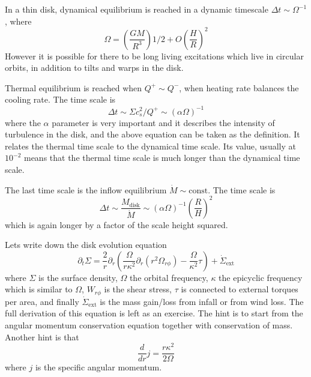 \documentclass[letterpaper, 11pt]{article}
\numberwithin{equation}{section}
\numberwithin{figure}{section}
\begin{document}
In a thin disk, dynamical equilibrium is reached in a dynamic timescale $\Delta
t \sim \Omega^{-1}$, where
\begin{equation}
  \label{eq:5}
  \Omega = \left( \frac{GM}{R^3} \right)1/2 + O \left( \frac{H}{R} \right)^2
\end{equation}
However it is possible for there to be long living excitations which live in
circular orbits, in addition to tilts and warps in the disk.

Thermal equilibrium is reached when $Q^+ \sim Q^{-}$, when heating rate balances
the cooling rate. The time scale is
\begin{equation}
  \label{eq:6}
  \Delta t \sim \Sigma c_s^2 / Q^+ \sim (\alpha\Omega)^{-1}
\end{equation}
where the $\alpha$ parameter is very important and it describes the intensity of
turbulence in the disk, and the above equation can be taken as the definition.
It relates the thermal time scale to the dynamical time scale. Its value,
usually at $10^{-2}$ means that the thermal time scale is much longer than the
dynamical time scale.

The last time scale is the inflow equilibrium $\dot{M} \sim \mathrm{const}$. The
time scale is
\begin{equation}
  \label{eq:7}
  \Delta t \sim \frac{M_\mathrm{disk}}{\dot{M}} \sim (\alpha\Omega)^{-1}\left( \frac{R}{H} \right)^2
\end{equation}
which is again longer by a factor of the scale height squared.

Lets write down the disk evolution equation
\begin{equation}
  \label{eq:8}
  \partial_t\Sigma = \frac{2}{r}\partial_r \left( \frac{\Omega}{r\kappa^2}\partial_r(r^2\Omega_{r\phi}) - \frac{\Omega}{\kappa^2}\tau \right) + \dot{\Sigma}_\mathrm{ext}
\end{equation}
where $\Sigma$ is the surface density, $\Omega$ the orbital frequency, $\kappa$
the epicyclic frequency which is similar to $\Omega$, $W_{r\phi}$ is the shear
stress, $\tau$ is connected to external torques per area, and finally
$\dot{\Sigma}_\mathrm{ext}$ is the mass gain/loss from infall or from wind loss.
The full derivation of this equation is left as an exercise. The hint is to
start from the angular momentum conservation equation together with conservation
of mass. Another hint is that
\begin{equation}
  \label{eq:9}
  \frac{d}{dr}j = \frac{r\kappa^2}{2\Omega}
\end{equation}
where $j$ is the specific angular momentum.
\end{document}
